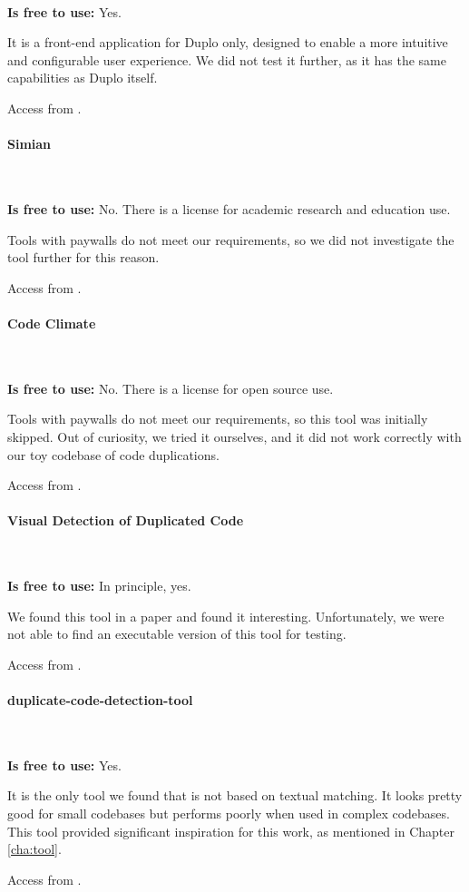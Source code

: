 \

\textbf{Is free to use:} Yes.

It is a front-end application for Duplo only, designed to 
enable a more intuitive and configurable user experience. 
We did not test it further, as it has the same capabilities 
as Duplo itself.

Access from
\textit{}.

\paragraph{Simian} 

\

\textbf{Is free to use:} No. 
There is a license for academic research and education use.

Tools with paywalls do not meet our requirements, 
so we did not investigate the tool further for this reason.

Access from
\textit{}.

\paragraph{Code Climate}

\

\textbf{Is free to use:} No. 
There is a license for open source use.

Tools with paywalls do not meet our requirements, so this 
tool was initially skipped. Out of curiosity, we tried it 
ourselves, and it did not work correctly with our toy
codebase of code duplications.

Access from
\textit{}.

\paragraph{Visual Detection of Duplicated Code}

\

\textbf{Is free to use:} In principle, yes.

We found this tool in a paper and found it interesting. 
Unfortunately, we were not able to find an executable 
version of this tool for testing.

Access from
\textit{}.

\paragraph{duplicate-code-detection-tool}

\

\textbf{Is free to use:} Yes.

It is the only tool we found that is not based on textual 
matching. It looks pretty good for small codebases but 
performs poorly when used in complex codebases. This tool 
provided significant inspiration for this work, as 
mentioned in Chapter \ref{cha:tool}.

Access from
\textit{}.


